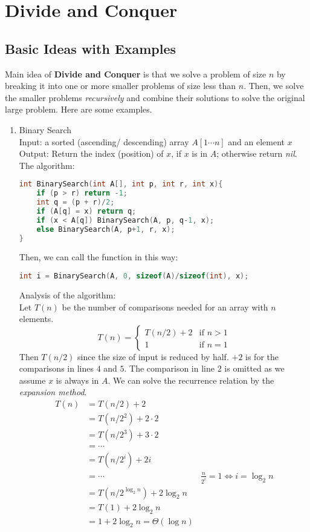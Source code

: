 \documentclass[11pt]{article}
\begin{document}
\section{Divide and Conquer}
\subsection{Basic Ideas with Examples}
Main idea of \textbf{Divide and Conquer} is that we solve a problem of size $n$ by breaking it into one or more smaller problems of size less than $n$. Then, we solve the smaller problems \textit{recursively} and combine their solutions to solve the original large problem. Here are some examples.
\begin{enumerate}
\item Binary Search\\
Input: a sorted (ascending/ descending) array $A[1 \cdots n]$ and an element $x$\\
Output: Return the index (position) of $x$, if $x$ is in $A$; otherwise return \textit{nil}.\\
The algorithm:
\begin{lstlisting}[language = C++]
int BinarySearch(int A[], int p, int r, int x){
	if (p > r) return -1;
	int q = (p + r)/2;
	if (A[q] = x) return q;
	if (x < A[q]) BinarySearch(A, p, q-1, x);
	else BinarySearch(A, p+1, r, x);
}
\end{lstlisting}
Then, we can call the function in this way:
\begin{lstlisting}[language = C++]
int i = BinarySearch(A, 0, sizeof(A)/sizeof(int), x);
\end{lstlisting}
Analysis of the algorithm:\\
Let $T(n)$ be the number of comparisons needed for an array with $n$ elements. $$T(n) = \begin{cases} 
T(n/2) +2& \text{if } n > 1\\
1& \text{if } n =1
\end{cases}$$Then  $T(n/2) $ since the size of input is reduced by half. $+ 2$ is for the comparisons in lines $4$ and $5$. The comparison in line $2$ is omitted as we assume $x$ is always in $A$. We can solve the recurrence relation by the \textit{expansion method}.
\begin{align*}
T(n) &= T(n/2) + 2\\
&= T(n/2^2) + 2 \cdot 2\\
&= T(n/2^3) + 3 \cdot 2\\
&=\cdots\\
&= T(n/2^i) + 2i\\
&=\cdots& \frac{n}{2^{i}} = 1 \iff i = \log_2 n\\
&= T(n/2^{\log_2 n}) + 2\log_2 n\\
&= T(1) + 2\log_2 n\\
&= 1+ 2\log_2 n = \Theta (\log n)
\end{align*}


\end{enumerate}
\end{document}
